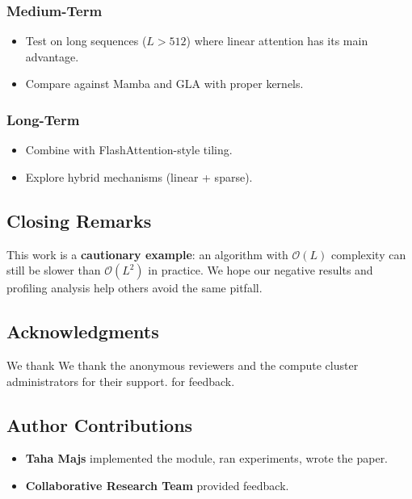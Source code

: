 \subsubsection{Medium-Term}

\begin{itemize}
\item Test on long sequences ($L > 512$) where linear attention has its main
  advantage.
\item Compare against Mamba and GLA with proper kernels.

\end{itemize}
\subsubsection{Long-Term}

\begin{itemize}
\item Combine with FlashAttention-style tiling.
\item Explore hybrid mechanisms (linear + sparse).

\end{itemize}
\subsection{Closing Remarks}

This work is a \textbf{cautionary example}: an algorithm with $\mathcal{O}(L)$ 
complexity can still be slower than $\mathcal{O}(L^2)$ in practice. We 
hope our negative results and profiling analysis help others avoid the 
same pitfall.

\subsection{Acknowledgments}

We thank We thank the anonymous reviewers and the compute cluster administrators for their support. for feedback.

\subsection{Author Contributions}

\begin{itemize}
\item \textbf{Taha Majs} implemented the module, ran experiments, wrote the paper.
\item \textbf{Collaborative Research Team} provided feedback.

\end{itemize}
